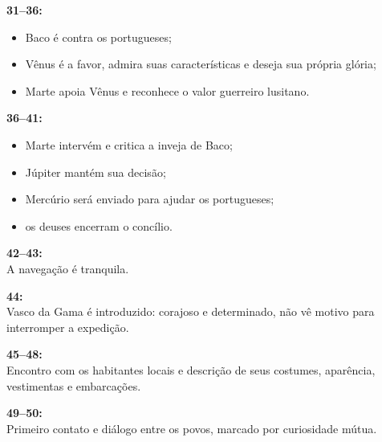 \medskip

\textbf{31--36:}
\begin{itemize}
    \item Baco é contra os portugueses;
    \item Vênus é a favor, admira suas características e deseja sua própria
      glória;
    \item Marte apoia Vênus e reconhece o valor guerreiro lusitano.
\end{itemize}

\medskip

\textbf{36--41:}
\begin{itemize}
    \item Marte intervém e critica a inveja de Baco;
    \item Júpiter mantém sua decisão;
    \item Mercúrio será enviado para ajudar os portugueses;
    \item os deuses encerram o concílio.
\end{itemize}

\medskip

\textbf{42--43:}\\
A navegação é tranquila.

\medskip

\textbf{44:}\\
Vasco da Gama é introduzido: corajoso e determinado, não vê motivo para
interromper a expedição.

\medskip

\textbf{45--48:}\\
Encontro com os habitantes locais e descrição de seus costumes, aparência,
vestimentas e embarcações.

\medskip

\textbf{49--50:}\\
Primeiro contato e diálogo entre os povos, marcado por curiosidade mútua.
